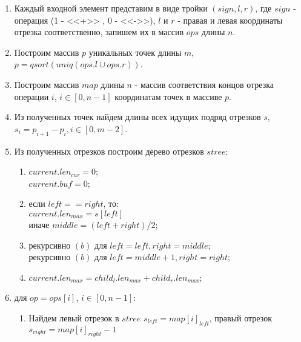 \documentclass[12pt]{article}
\begin{document}
\begin{enumerate}

\item Каждый входной элемент представим в виде тройки $(sign,l,r)$, где $sign$ - операция (1 - <<+>> , 0 - <<->>), $l$ и $r$ - правая и левая координаты  отрезка соответственно, запишем их в массив $ops$ длины $n$.

\item Построим массив $p$ уникальных точек длины $m$, $p = qsort(uniq(ops.l \cup ops.r))$.

\item Построим массив $map$ длины $n$ - массив соответствия концов отрезка операции $i$, $i \in [0, n-1]$ координатам точек в массиве $p$.

\item Из полученных точек найдем длины всех идущих подряд отрезков $s$, $s_i = p_{i+1} - p_i, i \in [0, m-2]$.

\item Из полученных отрезков построим дерево отрезков $stree$:

	\begin{enumerate}

	\item $current.len_{cur} = 0$;\\
		  $current.buf = 0$;

	\item если $left == right$, то:\\
		  $current.len_{max} = s[left]$\\	
	      иначе	$middle = (left + right)/2$;

	\item рекурсивно $(b)$ для $left = left, right = middle$;\\
		  рекурсивно $(b)$ для $left = middle + 1, right = right$;\\
		  
	\item $current.len_{max} = child_{l}.len_{max} + child_{r}.len_{max}$;	
		  
		
	\end{enumerate}

\item для $op = ops[i]$, $i \in [0, n-1]$:

	\begin{enumerate}
	
	\item Найдем левый отрезок в $stree$ $s_{left} = map[i]_{left}$, правый отрезок $s_{right} = map[i]_{right} - 1$
	

\end{enumerate}
\end{enumerate}
\end{document}
